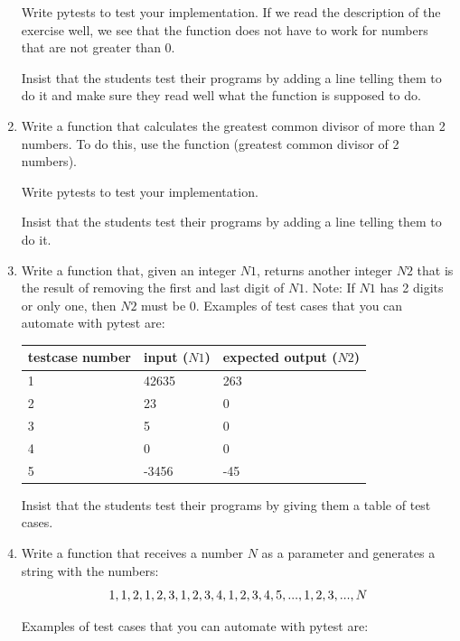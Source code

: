 \documentclass[
  fontsize=10pt,
  a4paper,
]{scrartcl}
\newenvironment{howTILEd}%
  {\begin{mdframed}[skipabove=10pt,skipbelow=10pt,backgroundcolor=pink!40]}%
  {\end{mdframed}}
\begin{document}
\begin{enumerate}
Write pytests to test your implementation.
If we read the description of the exercise well, we see that the function does not have to work for numbers that are not greater than 0.


\begin{howTILEd}
Insist that the students test their programs by adding a line telling them to do it and make sure they read well what the function is supposed to do.
\end{howTILEd}


\item Write a function  that calculates the greatest common divisor of more than 2 numbers. To do this, use the function  (greatest common divisor of 2 numbers).

Write pytests to test your implementation.

\begin{howTILEd}
Insist that the students test their programs by adding a line telling them to do it.
\end{howTILEd}

\item Write a function that, given an integer $N1$, returns another integer $N2$ that is the result of removing the first and last digit of $N1$. Note: If $N1$ has 2 digits or only one, then $N2$ must be 0. Examples of test cases that you can automate with pytest are:

\begin{longtable}{|l|l|l|}
\hline
testcase number & input ($N1$) & expected output ($N2$)  \\ \hline
1  & 42635   & 263 \\ 
2  & 23     & 0\\
3 & 5     & 0 \\
4 & 0      & 0 \\
5 & -3456  & -45 \\
\hline
\end{longtable}

\begin{howTILEd}
Insist that the students test their programs by giving them a table of test cases.
\end{howTILEd}


\item Write a function that receives a number $N$ as a parameter and generates a string with the numbers: $$1, 1, 2,
1, 2, 3, 1, 2, 3, 4, 1, 2, 3, 4, 5, . \-. . , 1, 2, 3, . . . , N $$

Examples of test cases that you can automate with pytest are:


\end{enumerate}
\end{document}
